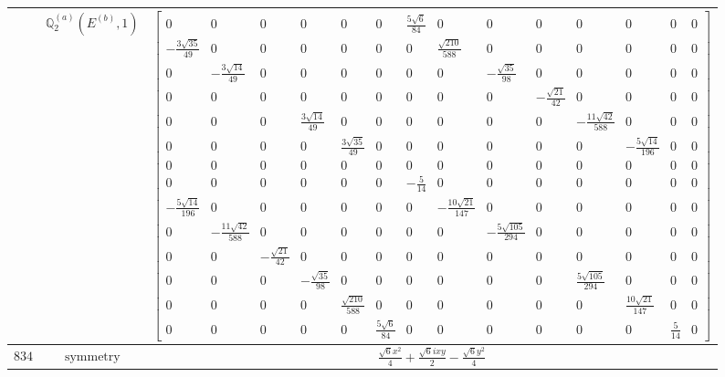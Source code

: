 \documentclass[fleqn,8pt,landscape]{jsarticle}
\begin{document}
\begin{longtable}{ccc}
$  $ & $ \mathbb{Q}_{2}^{(a)}(E^{(b)},1) $ & $ \begin{bmatrix} 0 & 0 & 0 & 0 & 0 & 0 & \frac{5 \sqrt{6}}{84} & 0 & 0 & 0 & 0 & 0 & 0 & 0 \\ - \frac{3 \sqrt{35}}{49} & 0 & 0 & 0 & 0 & 0 & 0 & \frac{\sqrt{210}}{588} & 0 & 0 & 0 & 0 & 0 & 0 \\ 0 & - \frac{3 \sqrt{14}}{49} & 0 & 0 & 0 & 0 & 0 & 0 & - \frac{\sqrt{35}}{98} & 0 & 0 & 0 & 0 & 0 \\ 0 & 0 & 0 & 0 & 0 & 0 & 0 & 0 & 0 & - \frac{\sqrt{21}}{42} & 0 & 0 & 0 & 0 \\ 0 & 0 & 0 & \frac{3 \sqrt{14}}{49} & 0 & 0 & 0 & 0 & 0 & 0 & - \frac{11 \sqrt{42}}{588} & 0 & 0 & 0 \\ 0 & 0 & 0 & 0 & \frac{3 \sqrt{35}}{49} & 0 & 0 & 0 & 0 & 0 & 0 & - \frac{5 \sqrt{14}}{196} & 0 & 0 \\ 0 & 0 & 0 & 0 & 0 & 0 & 0 & 0 & 0 & 0 & 0 & 0 & 0 & 0 \\ 0 & 0 & 0 & 0 & 0 & 0 & - \frac{5}{14} & 0 & 0 & 0 & 0 & 0 & 0 & 0 \\ - \frac{5 \sqrt{14}}{196} & 0 & 0 & 0 & 0 & 0 & 0 & - \frac{10 \sqrt{21}}{147} & 0 & 0 & 0 & 0 & 0 & 0 \\ 0 & - \frac{11 \sqrt{42}}{588} & 0 & 0 & 0 & 0 & 0 & 0 & - \frac{5 \sqrt{105}}{294} & 0 & 0 & 0 & 0 & 0 \\ 0 & 0 & - \frac{\sqrt{21}}{42} & 0 & 0 & 0 & 0 & 0 & 0 & 0 & 0 & 0 & 0 & 0 \\ 0 & 0 & 0 & - \frac{\sqrt{35}}{98} & 0 & 0 & 0 & 0 & 0 & 0 & \frac{5 \sqrt{105}}{294} & 0 & 0 & 0 \\ 0 & 0 & 0 & 0 & \frac{\sqrt{210}}{588} & 0 & 0 & 0 & 0 & 0 & 0 & \frac{10 \sqrt{21}}{147} & 0 & 0 \\ 0 & 0 & 0 & 0 & 0 & \frac{5 \sqrt{6}}{84} & 0 & 0 & 0 & 0 & 0 & 0 & \frac{5}{14} & 0 \end{bmatrix} $ \\ \hline
$ 834 $ & $ \text{symmetry} $ & $ \frac{\sqrt{6} x^{2}}{4} + \frac{\sqrt{6} i x y}{2} - \frac{\sqrt{6} y^{2}}{4} $ \\

\end{longtable}
\end{document}
